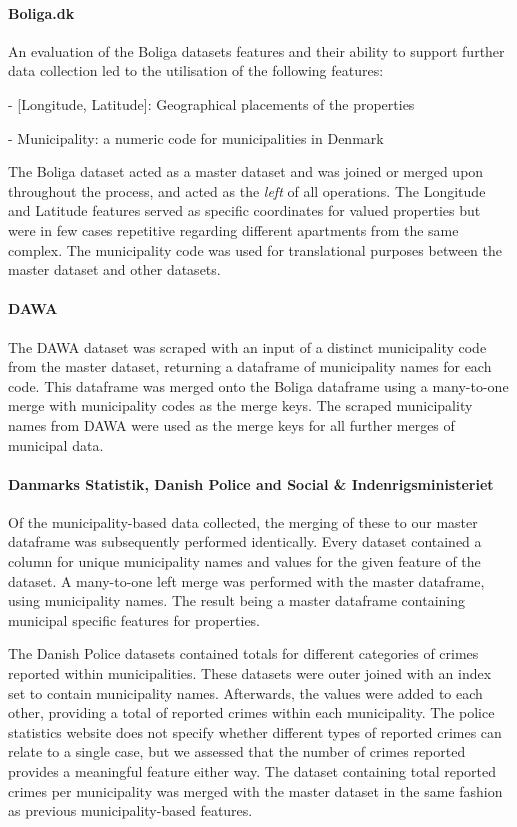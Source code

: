 \documentclass[12pt,a4paper]{article}
\begin{document}
\paragraph{Boliga.dk\newline}
An evaluation of the Boliga datasets features and their ability to support further data collection led to the utilisation of the following features: 

-	[Longitude, Latitude]: Geographical placements of the properties

-	Municipality: a numeric code for municipalities in Denmark

The Boliga dataset acted as a master dataset and was joined or merged upon throughout the process, and acted as the \textit{left} of all operations. The Longitude and Latitude features served as specific coordinates for valued properties but were in few cases repetitive regarding different apartments from the same complex. The municipality code was used for translational purposes between the master dataset and other datasets.  

\paragraph{DAWA\newline}
The DAWA dataset was scraped with an input of a distinct municipality code from the master dataset, returning a dataframe of municipality names for each code. This dataframe was merged onto the Boliga dataframe using a many-to-one merge with municipality codes as the merge keys. The scraped municipality names from DAWA were used as the merge keys for all further merges of municipal data. 

\paragraph{Danmarks Statistik, Danish Police and Social \& Indenrigsministeriet\newline}
Of the municipality-based data collected, the merging of these to our master dataframe was subsequently performed identically. Every dataset contained a column for unique municipality names and values for the given feature of the dataset. A many-to-one left merge was performed with the master dataframe, using municipality names. The result being a master dataframe containing municipal specific features for properties. 

The Danish Police datasets contained totals for different categories of crimes reported within municipalities. These datasets were outer joined with an index set to contain municipality names. Afterwards, the values were added to each other, providing a total of reported crimes within each municipality. The police statistics website does not specify whether different types of reported crimes can relate to a single case, but we assessed that the number of crimes reported provides a meaningful feature either way. The dataset containing total reported crimes per municipality was merged with the master dataset in the same fashion as previous municipality-based features. 
\end{document}
